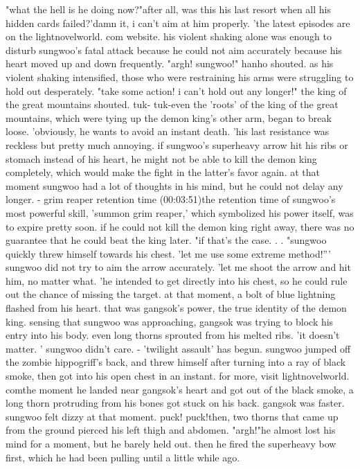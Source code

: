 "what the hell is he doing now?"after all, was this his last resort when all his hidden cards failed?'damn it, i can't aim at him properly.
'the latest episodes are on the lightnov‌elworld.
com website.
his violent shaking alone was enough to disturb sungwoo's fatal attack because he could not aim accurately because his heart moved up and down frequently.
"argh! sungwoo!" hanho shouted.
as his violent shaking intensified, those who were restraining his arms were struggling to hold out desperately.
"take some action! i can't hold out any longer!" the king of the great mountains shouted.
tuk- tuk-even the 'roots' of the king of the great mountains, which were tying up the demon king's other arm, began to break loose.
'obviously, he wants to avoid an instant death.
'his last resistance was reckless but pretty much annoying.
if sungwoo's superheavy arrow hit his ribs or stomach instead of his heart, he might not be able to kill the demon king completely, which would make the fight in the latter's favor again.
at that moment sungwoo had a lot of thoughts in his mind, but he could not delay any longer.
- grim reaper retention time (00:03:51)the retention time of sungwoo's most powerful skill, 'summon grim reaper,' which symbolized his power itself, was to expire pretty soon.
 if he could not kill the demon king right away, there was no guarantee that he could beat the king later.
"if that's the case.
.
.
"sungwoo quickly threw himself towards his chest.
'let me use some extreme method!'''
sungwoo did not try to aim the arrow accurately.
'let me shoot the arrow and hit him, no matter what.
'he intended to get directly into his chest, so he could rule out the chance of missing the target.
at that moment, a bolt of blue lightning flashed from his heart.
 that was gangsok's power, the true identity of the demon king.
sensing that sungwoo was approaching, gangsok was trying to block his entry into his body.
 even long thorns sprouted from his melted ribs.
'it doesn't matter.
' sungwoo didn't care.
- 'twilight assault' has begun.
sungwoo jumped off the zombie hippogriff's back, and threw himself after turning into a ray of black smoke, then got into his open chest in an instant.
for more, visit lightnovelworld.
comthe moment he landed near gangsok's heart and got out of the black smoke, a long thorn protruding from his bones got stuck on his back.
 gangsok was faster.
sungwoo felt dizzy at that moment.
puck! puck!then, two thorns that came up from the ground pierced his left thigh and abdomen.
"argh!"he almost lost his mind for a moment, but he barely held out.
then he fired the superheavy bow first, which he had been pulling until a little while ago.
